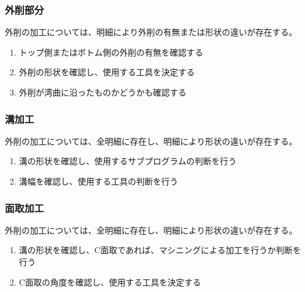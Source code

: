\subsubsection{外削部分}
外削の加工については、明細により外削の有無または形状の違いが存在する。
\begin{enumerate}
\item トップ側またはボトム側の外削の有無を確認する
\item 外削の形状を確認し、使用する工具を決定する
\item {}外削が湾曲に沿ったものかどうかも確認する
\end{enumerate}

\subsubsection{溝加工}
外削の加工については、全明細に存在し、明細により形状の違いが存在する。
\begin{enumerate}
\item 溝の形状を確認し、使用するサブプログラムの判断を行う
\item {}溝幅を確認し、使用する工具の判断を行う
\end{enumerate}

\subsubsection{面取加工}
外削の加工については、全明細に存在し、明細により形状の違いが存在する。
\begin{enumerate}
\item 溝の形状を確認し、C面取であれば、マシニングによる加工を行うか判断を行う
\item {}C面取の角度を確認し、使用する工具を決定する
\end{enumerate}


\clearpage
